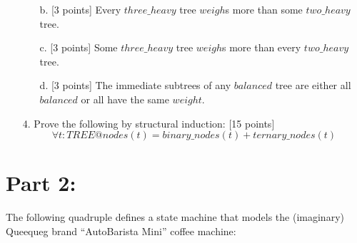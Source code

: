 \documentclass[12pt,fleqn]{article}
\begin{document}
\begin{enumerate}
\begin{enumerate}
\item[b.] [3 points] Every $three\_heavy$ tree $weigh$s more than some $two\_heavy$ tree. 

\vspace{1in} %

\item[c.] [3 points] Some $three\_heavy$ tree $weigh$s more than every $two\_heavy$ tree. 

\vspace{1in} %

\item[d.] [3 points] The immediate subtrees of any $balanced$ tree are either all $balanced$ or all have the same $weight$. 

\vspace{1in} %

\end{enumerate}

\clearpage

\item[4.] Prove the following by structural induction: [15 points]
$$\forall t:TREE@nodes(t) = binary\_nodes(t) + ternary\_nodes(t)$$


\end{enumerate}

\clearpage

\section*{\sc Part 2:}

The following quadruple defines a state machine that models the (imaginary) Queequeg brand ``AutoBarista Mini'' coffee machine:
\end{document}
